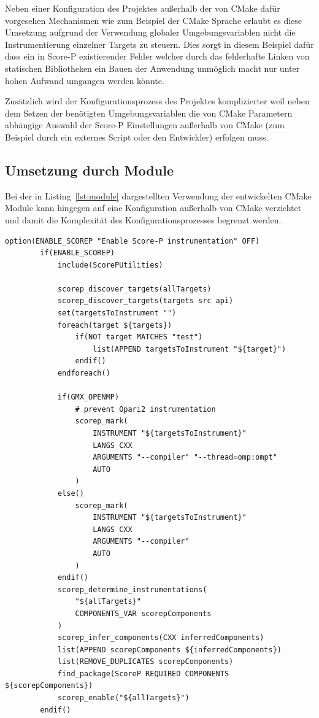 \documentclass[german,proseminar,hyperref,utf8,lof]{zihpub}
\begin{document}
    Neben einer Konfiguration des Projektes au{\ss}erhalb der von CMake dafür vorgesehen Mechanismen
    wie zum Beispiel der CMake Sprache erlaubt es diese Umsetzung aufgrund der Verwendung globaler
    Umgebungsvariablen nicht die Instrumentierung einzelner Targets zu steuern.
    Dies sorgt in diesem Beispiel dafür dass ein in Score-P existierender Fehler welcher durch das
    fehlerhafte Linken von statischen Bibliotheken ein Bauen der Anwendung unmöglich macht
    nur unter hohen Aufwand umgangen werden könnte.

    Zusätzlich wird der Konfigurationsprozess des Projektes komplizierter weil neben dem Setzen der
    benötigten Umgebungsvariablen die von CMake Parametern abhängige Auswahl der Score-P Einstellungen
    au{\ss}erhalb von CMake (zum Beispiel durch ein externes Script oder den Entwickler) erfolgen muss.

    \subsection{Umsetzung durch Module}
    Bei der in Listing~\ref{lst:module} dargestellten Verwendung der entwickelten CMake Module kann
    hingegen auf eine Konfiguration au{\ss}erhalb von CMake verzichtet und damit die Komplexität
    des Konfigurationsprozesses begrenzt werden.

    \begin{lstlisting}[caption=Anwendung der entwickelten Module bei GROMACS, gobble=8, label=lst:module]
        option(ENABLE_SCOREP "Enable Score-P instrumentation" OFF)
        if(ENABLE_SCOREP)
            include(ScorePUtilities)
        
            scorep_discover_targets(allTargets)
            scorep_discover_targets(targets src api)
            set(targetsToInstrument "")
            foreach(target ${targets})
                if(NOT target MATCHES "test")
                    list(APPEND targetsToInstrument "${target}")
                endif()
            endforeach()
            
            if(GMX_OPENMP)
                # prevent Opari2 instrumentation
                scorep_mark(
                    INSTRUMENT "${targetsToInstrument}"
                    LANGS CXX
                    ARGUMENTS "--compiler" "--thread=omp:ompt"
                    AUTO
                )
            else()
                scorep_mark(
                    INSTRUMENT "${targetsToInstrument}"
                    LANGS CXX
                    ARGUMENTS "--compiler"
                    AUTO
                )
            endif()
            scorep_determine_instrumentations(
                "${allTargets}"
                COMPONENTS_VAR scorepComponents
            )
            scorep_infer_components(CXX inferredComponents)
            list(APPEND scorepComponents ${inferredComponents})
            list(REMOVE_DUPLICATES scorepComponents)
            find_package(ScoreP REQUIRED COMPONENTS ${scorepComponents})
            scorep_enable("${allTargets}")
        endif()
    \end{lstlisting}
\end{document}
